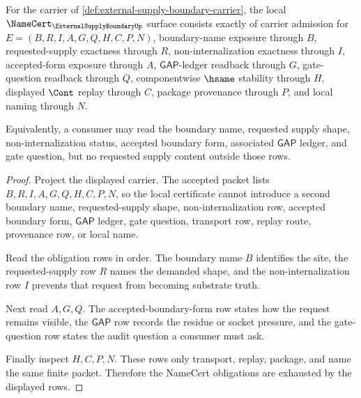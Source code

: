 \begin{theorem}
\label{thm:external-supply-boundary-namecert-obligations}
For the carrier of \autoref{def:external-supply-boundary-carrier}, the local $\NameCert_{\ExternalSupplyBoundaryUp}$ surface consists exactly of carrier admission for $E=(B,R,I,A,G,Q,H,C,P,N)$, boundary-name exposure through $B$, requested-supply exactness through $R$, non-internalization exactness through $I$, accepted-form exposure through $A$, $\mathsf{GAP}$-ledger readback through $G$, gate-question readback through $Q$, componentwise $\hsame$ stability through $H$, displayed $\Cont$ replay through $C$, package provenance through $P$, and local naming through $N$.

Equivalently, a consumer may read the boundary name, requested supply shape, non-internalization status, accepted boundary form, associated $\mathsf{GAP}$ ledger, and gate question, but no requested supply content outside those rows.
\end{theorem}
\begin{proof}
Project the displayed carrier. The accepted packet lists $B,R,I,A,G,Q,H,C,P,N$, so the local certificate cannot introduce a second boundary name, requested-supply shape, non-internalization row, accepted boundary form, $\mathsf{GAP}$ ledger, gate question, transport row, replay route, provenance row, or local name.

Read the obligation rows in order. The boundary name $B$ identifies the site, the requested-supply row $R$ names the demanded shape, and the non-internalization row $I$ prevents that request from becoming substrate truth.

Next read $A,G,Q$. The accepted-boundary-form row states how the request remains visible, the $\mathsf{GAP}$ row records the residue or socket pressure, and the gate-question row states the audit question a consumer must ask.

Finally inspect $H,C,P,N$. These rows only transport, replay, package, and name the same finite packet. Therefore the NameCert obligations are exhausted by the displayed rows.
\end{proof}

